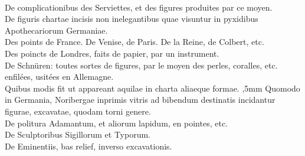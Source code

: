 \\
\hspace*{-7.5mm}De complicationibus des Serviettes, et des figures produites par ce moyen.\\
\hspace*{-7.5mm}De figuris chartae incisis non inelegantibus quae visuntur in pyxidibus Apothecariorum Germaniae.\\
\hspace*{-7.5mm}Des points de France.
De Venise\protect{}, de Paris\protect{}.
De la Reine, de Colbert,\protect{}
etc.\\
\hspace*{-7.5mm}Des poincts de Londres\protect{}, faits de papier, par un instrument.\\
\hspace*{-7.5mm}De Schn\"{u}ren:
toutes sortes de figures, par le moyen des perles, coralles, etc. enfil\'{e}es, usit\'{e}es en Allemagne.\\
\hspace*{-7.5mm}Quibus modis fit ut appareant aquilae in charta aliaeque formae.
\pend
\count{}
\count{}
\count{}
\pstart%
\noindent%
,5mm%
Quomodo in Germania, Noribergae\protect{}
inprimis vitris ad bibendum destinatis incidantur figurae, excavatae, quodam torni genere.\\
\hspace*{-7.5mm}De politura Adamantum, et aliorum lapidum, en pointes, etc.\\
\hspace*{-7.5mm}De Sculptoribus Sigillorum et Typorum.\\
\hspace*{-7.5mm}De Eminentiis, bas relief, inverso excavationis.\\
